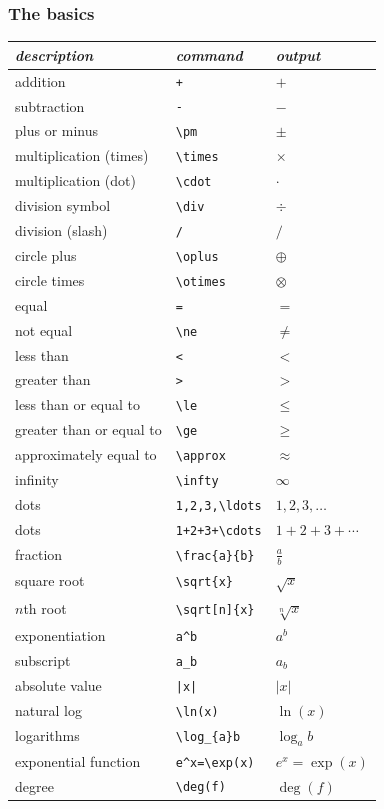 \documentclass{article} %
\begin{document}
    \subsubsection{The basics}
        \begin{center}
        \begin{tabular}{l|l|l}
        \emph{description} & \emph{command} & \emph{output}\\ \hline
        addition & \verb!+! & $+$\\
        subtraction & \verb!-! & $-$\\
        plus or minus & \verb!\pm! & $\pm$\\
        multiplication (times) & \verb!\times! & $\times$\\
        multiplication (dot) & \verb!\cdot! & $\cdot$\\
        division symbol & \verb!\div! & $\div$\\
        division (slash) & \verb!/! & $/$\\
        circle plus & \verb!\oplus! & $\oplus$\\
        circle times & \verb!\otimes! & $\otimes$\\
        equal & \verb!=! & $=$\\
        not equal & \verb!\ne! & $\ne$\\
        less than & \verb!<! & $<$\\
        greater than & \verb!>! & $>$\\
        less than or equal to & \verb!\le! & $\le$\\
        greater than or equal to & \verb!\ge! & $\ge$\\
        approximately equal to & \verb!\approx! & $\approx$\\
        infinity & \verb!\infty! & $\infty$\\
        dots & \verb!1,2,3,\ldots! & $1,2,3,\ldots$\\
        dots & \verb!1+2+3+\cdots! & $1+2+3+\cdots$\\
        fraction & \verb!\frac{a}{b}! & $\frac{a}{b}$\\
        square root & \verb!\sqrt{x}! & $\sqrt{x}$\\
        $n$th root & \verb!\sqrt[n]{x}! & $\sqrt[n]{x}$\\
        exponentiation & \verb!a^b! & $a^{b}$\\
        subscript & \verb!a_b! & $a_{b}$\\
        absolute value & \verb!|x|! & $|x|$\\
        natural log  & \verb!\ln(x)! & $\ln(x)$\\
        logarithms & \verb!\log_{a}b! & $\log_{a}b$\\
        exponential function & \verb!e^x=\exp(x)! & $e^{x}=\exp(x)$\\
        degree & \verb!\deg(f)! & $\deg(f)$\\
        \end{tabular}
        \end{center}
    \newpage
\end{document}
